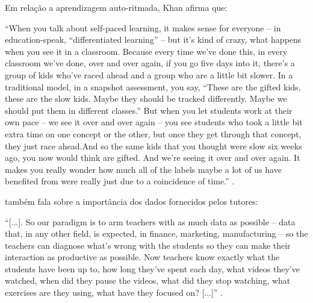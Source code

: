 Em relação a aprendizagem auto-ritmada, Khan afirma que:
\begin{citacao}
``When you talk about self-paced learning, it makes sense for everyone -- in education-speak, ``differentiated learning'' -- but it's kind of crazy, what happens when you see it in a classroom. Because every time we've done this, in every classroom we've done, over and over again, if you go five days into it, there's a group of kids who've raced ahead and a group who are a little bit slower. In a traditional model, in a snapshot assessment, you say, ``These are the gifted kids, these are the slow kids. Maybe they should be tracked differently. Maybe we should put them in different classes.'' But when you let students work at their own pace -- we see it over and over again -- you see students who took a little bit extra time on one concept or the other, but once they get through that concept, they just race ahead.And so the same kids that you thought were slow six weeks ago, you now would think are gifted. And we're seeing it over and over again. It makes you really wonder how much all of the labels maybe a lot of us have benefited from were really just due to a coincidence of time.'' \cite{tedtalk2011reinvend}.
\end{citacao}


 também fala sobre a importância dos dados fornecidos pelos tutores:
\begin{citacao}
``[...]. So our paradigm is to arm teachers with as much data as possible -- data that, in any other field, is expected, in finance, marketing, manufacturing -- so the teachers can diagnose what's wrong with the students so they can make their interaction as productive as possible. Now teachers know exactly what the students have been up to, how long they've spent each day, what videos they've watched, when did they pause the videos, what did they stop watching, what exercises are they using, what have they focused on? [...]'' \cite{tedtalk2011reinvend}.
\end{citacao}

